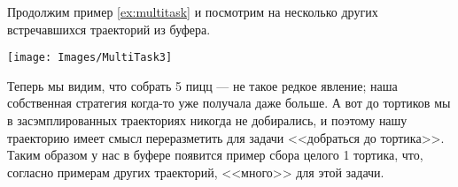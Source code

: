 \begin{example}
Продолжим пример \ref{ex:multitask} и посмотрим на несколько других встречавшихся траекторий из буфера.
\begin{center}
    \texttt{[image: Images/MultiTask3]}
\end{center}
Теперь мы видим, что собрать 5 пицц --- не такое редкое явление; наша собственная стратегия когда-то уже получала даже больше. А вот до тортиков мы в засэмплированных траекториях никогда не добирались, и поэтому нашу траекторию имеет смысл переразметить для задачи <<добраться до тортика>>. Таким образом у нас в буфере появится пример сбора целого 1 тортика, что, согласно примерам других траекторий, <<много>> для этой задачи.
\end{example}